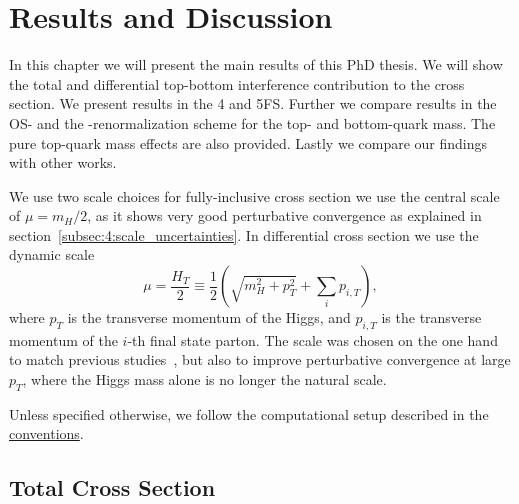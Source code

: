 
\chapter{Results and Discussion}\label{chap:siz}

In this chapter we will present the main results of this PhD thesis. We will show the total and differential top-bottom interference contribution to the cross section. We present results in the 4 and 5\acs{FS}. Further we compare results in the \acs{OS}- and the \MS-renormalization scheme for the top- and bottom-quark mass. The pure top-quark mass effects are also provided. Lastly we compare our findings with other works.

We use two scale choices for fully-inclusive cross section we use the central scale of $\mu = m_H/2$, as it shows very good perturbative convergence as explained in section~\ref{subsec:4:scale_uncertainties}. In differential cross section we use the dynamic scale
\begin{equation}
\mu = \frac{H_T}{2} \equiv \frac{1}{2} \left( \sqrt{m_H^2 + p_T^2} + \sum_i p_{i, T} \right),
\end{equation}
where $p_T$ is the transverse momentum of the Higgs, and $p_{i, T}$ is the transverse momentum of the $i$-th final state parton. The scale was chosen on the one hand to match previous studies~\cite{Lindert:2017pky, Bonciani:2022jmb, Jones:2018hbb}, but also to improve perturbative convergence at large $p_T$, where the Higgs mass alone is no longer the natural scale.

Unless specified otherwise, we follow the computational setup described in the \hyperref[chap:notation_and_conventions]{conventions}.

\section{Total Cross Section}
